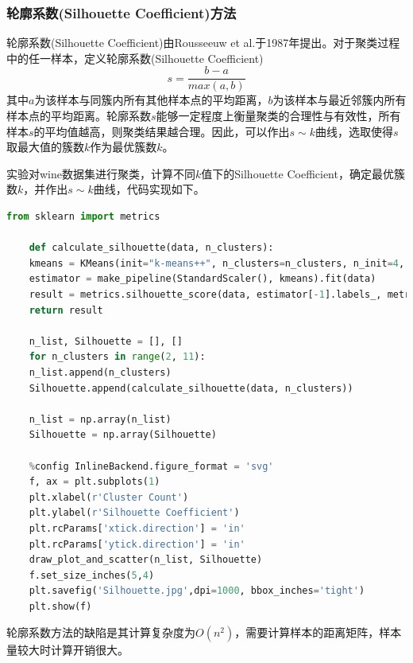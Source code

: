 \documentclass[12pt]{article}
\begin{document}
\subsubsection{轮廓系数(Silhouette Coefficient)方法}
	轮廓系数(Silhouette Coefficient)由Rousseeuw et al.于1987年提出\citealp{rousseeuw1987silhouettes}。对于聚类过程中的任一样本，定义轮廓系数(Silhouette Coefficient)
	$$
	s=\frac{b-a}{max(a,b)}
	$$
	其中$a$为该样本与同簇内所有其他样本点的平均距离，$b$为该样本与最近邻簇内所有样本点的平均距离。轮廓系数$s$能够一定程度上衡量聚类的合理性与有效性，所有样本$s$的平均值越高，则聚类结果越合理。因此，可以作出$s\sim k$曲线，选取使得$s$取最大值的簇数$k$作为最优簇数$k$。\par 
	实验对wine数据集进行聚类，计算不同$k$值下的Silhouette Coefficient，确定最优簇数$k$，并作出$s\sim k$曲线，代码实现如下。
\begin{lstlisting}[language=python]
	from sklearn import metrics
	
	def calculate_silhouette(data, n_clusters):
	kmeans = KMeans(init="k-means++", n_clusters=n_clusters, n_init=4, random_state=0)
	estimator = make_pipeline(StandardScaler(), kmeans).fit(data)
	result = metrics.silhouette_score(data, estimator[-1].labels_, metric="euclidean", sample_size=300)
	return result
		
	n_list, Silhouette = [], []
	for n_clusters in range(2, 11):
	n_list.append(n_clusters)
	Silhouette.append(calculate_silhouette(data, n_clusters))
		
	n_list = np.array(n_list)
	Silhouette = np.array(Silhouette)
		
	%config InlineBackend.figure_format = 'svg'
	f, ax = plt.subplots(1)
	plt.xlabel(r'Cluster Count')
	plt.ylabel(r'Silhouette Coefficient')
	plt.rcParams['xtick.direction'] = 'in'
	plt.rcParams['ytick.direction'] = 'in'
	draw_plot_and_scatter(n_list, Silhouette)
	f.set_size_inches(5,4)
	plt.savefig('Silhouette.jpg',dpi=1000, bbox_inches='tight')
	plt.show(f)
\end{lstlisting}
	\par 
	轮廓系数方法的缺陷是其计算复杂度为$O(n^{2})$，需要计算样本的距离矩阵，样本量较大时计算开销很大。
\end{document}
